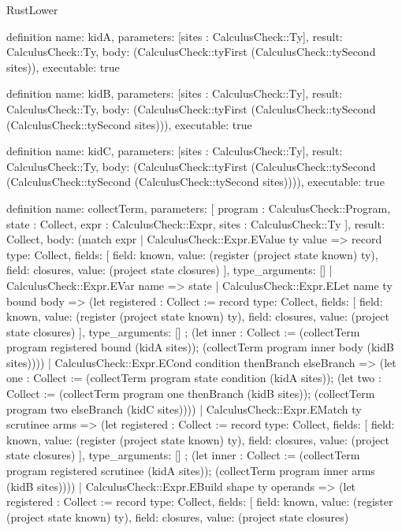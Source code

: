 \begin{lexlean}{RustLower}
\begin{semanticmodule}
definition{
  name: kidA,
  parameters: [sites : CalculusCheck::Ty],
  result: CalculusCheck::Ty,
  body: (CalculusCheck::tyFirst (CalculusCheck::tySecond sites)),
  executable: true
}

definition{
  name: kidB,
  parameters: [sites : CalculusCheck::Ty],
  result: CalculusCheck::Ty,
  body: (CalculusCheck::tyFirst (CalculusCheck::tySecond (CalculusCheck::tySecond sites))),
  executable: true
}

definition{
  name: kidC,
  parameters: [sites : CalculusCheck::Ty],
  result: CalculusCheck::Ty,
  body: (CalculusCheck::tyFirst (CalculusCheck::tySecond (CalculusCheck::tySecond (CalculusCheck::tySecond sites)))),
  executable: true
}

definition{
  name: collectTerm,
  parameters: [
    program : CalculusCheck::Program,
    state : Collect,
    expr : CalculusCheck::Expr,
    sites : CalculusCheck::Ty
  ],
  result: Collect,
  body: (match expr
    | CalculusCheck::Expr.EValue ty value => record{
      type: Collect,
      fields: [
        {field: known, value: (register (project state known) ty)},
        {field: closures, value: (project state closures)}
      ],
      type_arguments: []
    }
    | CalculusCheck::Expr.EVar name => state
    | CalculusCheck::Expr.ELet name ty bound body => (let registered : Collect := record{
      type: Collect,
      fields: [
        {field: known, value: (register (project state known) ty)},
        {field: closures, value: (project state closures)}
      ],
      type_arguments: []
    }; (let inner : Collect := (collectTerm program registered bound (kidA sites)); (collectTerm program inner body (kidB sites))))
    | CalculusCheck::Expr.ECond condition thenBranch elseBranch => (let one : Collect := (collectTerm program state condition (kidA sites)); (let two : Collect := (collectTerm program one thenBranch (kidB sites)); (collectTerm program two elseBranch (kidC sites))))
    | CalculusCheck::Expr.EMatch ty scrutinee arms => (let registered : Collect := record{
      type: Collect,
      fields: [
        {field: known, value: (register (project state known) ty)},
        {field: closures, value: (project state closures)}
      ],
      type_arguments: []
    }; (let inner : Collect := (collectTerm program registered scrutinee (kidA sites)); (collectTerm program inner arms (kidB sites))))
    | CalculusCheck::Expr.EBuild shape ty operands => (let registered : Collect := record{
      type: Collect,
      fields: [
        {field: known, value: (register (project state known) ty)},
        {field: closures, value: (project state closures)}
}}
\end{semanticmodule}
\end{lexlean}
